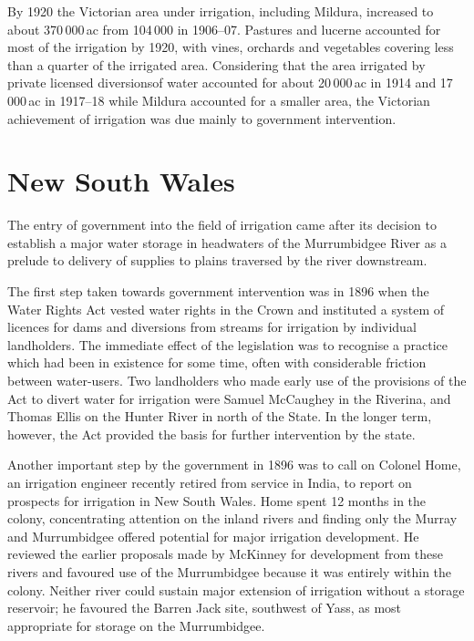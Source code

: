 By 1920 the Victorian area under irrigation, including Mildura,
increased to about 370\,000\,ac from 104\,000 in
1906--07.  Pastures and lucerne
accounted for most of the irrigation by 1920, with vines, orchards and
vegetables covering less than a quarter of the irrigated
area. Considering that the area irrigated by private licensed
diversionsof water accounted for about 20\,000\,ac in 1914 and
17\,000\,ac in 1917--18 while Mildura accounted for a smaller area,
the Victorian achievement of irrigation was due mainly to government
intervention.

\section*{New South Wales}

The entry of government into the field of irrigation came after its
decision to establish a major water storage in headwaters of the
Murrumbidgee River as a prelude to delivery of supplies to plains
traversed by the river downstream.

The first step taken towards government intervention was in 1896 when
the Water Rights Act vested water rights in the Crown and instituted a
system of licences for dams and diversions from streams for irrigation
by individual landholders.  The immediate effect of the legislation
was to recognise a practice which had been in existence for some time,
often with considerable friction between water-users.  Two
landholders who made early use of the provisions of the Act to divert
water for irrigation were Samuel McCaughey in the Riverina, and Thomas
Ellis on the Hunter River in north of the State.  In the longer term,
however, the Act provided the basis for further intervention by the
state.

Another important step by the government in 1896 was to call on
Colonel Home, an irrigation engineer recently retired from service in
India, to report on prospects for irrigation in New South Wales.  Home
spent 12 months in the colony, concentrating attention on the inland
rivers and finding only the Murray and Murrumbidgee offered potential
for major irrigation development.  He reviewed the earlier proposals
made by McKinney for development from these rivers and favoured use of
the Murrumbidgee because it was entirely within the colony.  Neither
river could sustain major extension of irrigation without a storage
reservoir; he favoured the Barren Jack site, southwest of Yass, as
most appropriate for storage on the Murrumbidgee.

